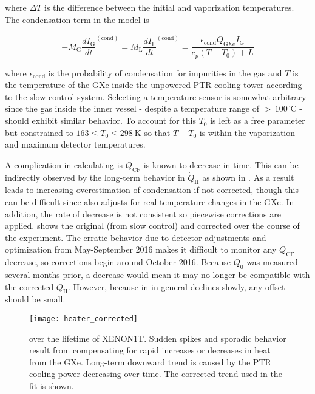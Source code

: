 \noindent where $\Delta T$ is the difference between the initial and vaporization temperatures.  The condensation term in the model is

\vspace{-10pt}

\begin{equation}
-M_{\mathrm{G}} \frac{dI_{\mathrm{G}}}{dt}^{(\mathrm{cond})} = M_{\mathrm{L}} \frac{dI_{\mathrm{L}}}{dt}^{(\mathrm{cond})} =
\frac{\epsilon_{\mathrm{cond}} \dot{Q}_{\mathrm{GXe}} I_{\mathrm{G}}}{c_p (T - T_0) + L}
\end{equation}

\noindent where $\epsilon_{\mathrm{cond}}$ is the probability of condensation for impurities in the gas and $T$ is the temperature of
the GXe inside the unpowered PTR cooling tower according to the slow control system.  Selecting a temperature sensor is somewhat arbitrary
since the gas inside the inner
vessel - despite a temperature range of ${>}\, 100^{\circ}\mathrm{C}$ - should exhibit similar behavior.  To account for this $T_0$ is left
as a free parameter but constrained to $163 \leq T_0 \leq 298\ \mathrm{K}$ so that $T - T_0$ is within the vaporization and maximum detector
temperatures.

A complication in calculating \qdg is $\dot{Q}_{\mathrm{CF}}$ is known to decrease in time.  This can be indirectly observed by
the long-term behavior in $\dot{Q}_{\mathrm{H}}$ as shown in .  As a result
 leads to increasing overestimation of condensation if not
corrected, though this can be difficult since \qdh also adjusts for real temperature changes in the
GXe.  In addition, the rate of decrease is not consistent so piecewise corrections are
applied.   shows the original (from slow control) and corrected \qdh over the
course of the experiment.  The erratic behavior due to detector adjustments and optimization from May-September 2016 makes it difficult to
monitor any $\dot{Q}_{\mathrm{CF}}$ decrease, so corrections begin around October 2016.  Because $Q_0$ was measured several months prior, a
decrease would mean it may no longer be compatible with the corrected $\dot{Q}_{\mathrm{H}}$.  However, because in \qdh in general declines
slowly, any offset should be small.

\begin{figure}
\centering
\texttt{[image: heater\_corrected]}
\caption{\qdh over the lifetime of XENON1T.  Sudden spikes and sporadic behavior result from compensating for rapid increases or decreases
in heat from the GXe.  Long-term downward trend is caused by the PTR cooling power decreasing over time.  The corrected trend
used in the fit is shown.}
\label{fig:electron_lifetime_model_vap_and_cond_heater_all}
\end{figure}



